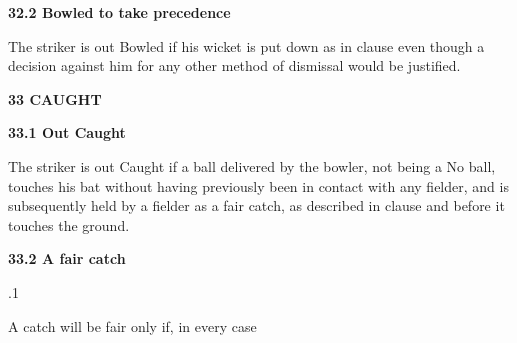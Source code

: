 \documentclass[12pt]{article}
\begin{document}
\vspace{\baselineskip}
{\fontsize{11pt}{13.2pt}\selectfont \textbf{32.2 \tabto{0.47in} Bowled to take precedence}\par}\par


\vspace{\baselineskip}
\begin{adjustwidth}{0.0in}{0.06in}
{\fontsize{9pt}{10.8pt}\selectfont The striker is out Bowled if his wicket is put down as in clause even though a decision against him for any other method of dismissal would be justified.\par}\par

\end{adjustwidth}


\vspace{\baselineskip}
{\fontsize{16pt}{19.2pt}\selectfont \textbf{33 CAUGHT}\par}\par


\vspace{\baselineskip}
{\fontsize{11pt}{13.2pt}\selectfont \textbf{33.1 \tabto{0.47in} Out Caught}\par}\par


\vspace{\baselineskip}
\begin{adjustwidth}{0.0in}{0.38in}
{\fontsize{9pt}{10.8pt}\selectfont The striker is out Caught if a ball delivered by the bowler, not being a No ball, touches his bat without having previously been in contact with any fielder, and is subsequently held by a fielder as a fair catch, as described in clause and before it touches the ground.\par}\par

\end{adjustwidth}


\vspace{\baselineskip}
{\fontsize{11pt}{13.2pt}\selectfont \textbf{33.2 \tabto{0.47in} A fair catch}\par}\par


\vspace{\baselineskip}
{\fontsize{9pt}{10.8pt}.1 \tabto{0.49in} {\fontsize{8pt}{9.6pt}\selectfont A catch will be fair only if, in every case\par}\par}\par
\end{document}
